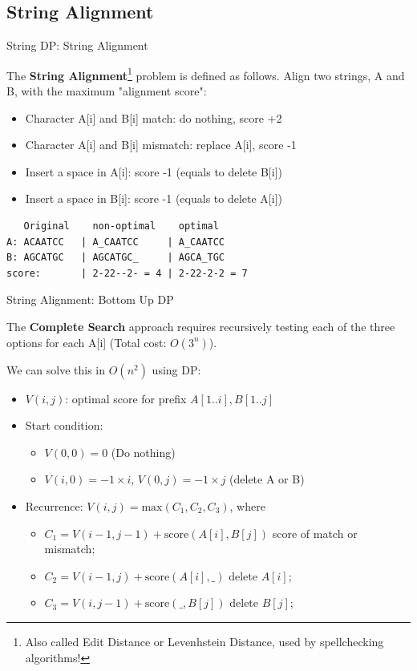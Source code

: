 \subsection{String Alignment}
\begin{frame}[fragile]{String DP: String Alignment}

The {\bf String Alignment}\footnote{Also called Edit Distance or Levenhstein Distance, used by spellchecking algorithms!} problem is defined as follows. Align two strings, A and B, with the maximum "alignment score":\bigskip

\begin{itemize}
  \item Character A[i] and B[i] match: do nothing, score +2
  \item Character A[i] and B[i] mismatch: replace A[i], score -1
  \item Insert a space in A[i]: score -1 (equals to delete B[i])
  \item Insert a space in B[i]: score -1 (equals to delete A[i])
\end{itemize}

\begin{verbatim}
   Original    non-optimal    optimal
A: ACAATCC   | A_CAATCC     | A_CAATCC
B: AGCATGC   | AGCATGC_     | AGCA_TGC
score:       | 2-22--2- = 4 | 2-22-2-2 = 7
\end{verbatim}\bigskip
\end{frame}


\begin{frame}[fragile]{String Alignment: Bottom Up DP}

  The {\bf Complete Search} approach requires recursively testing each of the three options for each A[i] (Total cost: $O(3^n)$).\bigskip

  We can solve this in $O(n^2)$ using DP:

  \begin{itemize}
    \item $V(i,j)$: optimal score for prefix $A[1..i],B[1..j]$
    \item Start condition:
    \begin{itemize}
      \item $V(0,0) = 0$ \hspace{1cm} (Do nothing)
      \item $V(i,0) = -1\times i$, $V(0,j) = -1\times j$ \hfill (delete A or B)
    \end{itemize}
    \item Recurrence: $V(i,j) = \text{max}(C_1, C_2, C_3)$, where
    \begin{itemize}
      \item $C_1 = V(i-1, j-1) + \text{score}(A[i],B[j])$ \hfill score of match or mismatch;
      \item $C_2 = V(i-1,j) + \text{score}(A[i],\_)$ \hfill delete $A[i]$;
      \item $C_3 = V(i,j-1) + \text{score}(\_,B[j])$ \hfill delete $B[j]$;
    \end{itemize}
  \end{itemize}
\end{frame}


